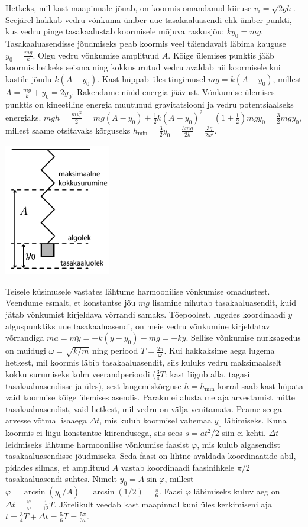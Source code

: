 {\ifSolution
\osa Hetkeks, mil kast maapinnale jõuab, on koormis omandanud kiiruse $v_i=\sqrt{2gh}$. Seejärel hakkab vedru võnkuma ümber uue tasakaaluasendi ehk ümber punkti, kus vedru pinge tasakaalustab koormisele mõjuva raskusjõu: $ky_0=mg$. Tasakaaluasendisse jõudmiseks peab koormis veel täiendavalt läbima kauguse $y_0=\frac{mg}{k}$. Olgu vedru võnkumise amplituud $A$. Kõige ülemises punktis jääb koormis hetkeks seisma ning kokkusurutud vedru avaldab nii koormisele kui kastile jõudu $k(A-y_0)$. Kast hüppab üles tingimusel $mg = k(A-y_0)$, millest $A = \frac{mg}{k}+y_0 =2y_0$. Rakendame nüüd energia jäävust. Võnkumise ülemises punktis on kineetiline energia muutunud gravitatsiooni ja vedru potentsiaalseks energiaks. $mgh=\frac{mv_i^2}{2} = mg(A-y_0) + \frac{1}{2}k(A-y_0)^2 = \left(1+ \frac{1}{2}\right)mgy_0 = \frac{3}{2}mgy_0$, millest saame otsitavaks kõrguseks $h_\text{min} = \frac{3}{2}y_0 = \frac{3mg}{2k} = \frac{3g}{2\omega^2}$.\\
\begin{center}
\includegraphics[width=0.35\textwidth]{2015-v3g-08-vedruJoonis_v2.pdf}
\end{center}
\osa Teisele küsimusele vastates lähtume harmoonilise võnkumise omadustest. Veendume esmalt, et konstantse jõu $mg$ lisamine nihutab tasakaaluasendit, kuid jätab võnkumist kirjeldava võrrandi samaks. Tõepoolest, lugedes koordinaadi $y$ alguspunktiks uue tasakaaluasendi, on meie vedru võnkumine kirjeldatav võrrandiga $ma = m \ddot{y} = -k(y-y_0) - mg = -ky$. Sellise võnkumise nurksagedus on muidugi $\omega=\sqrt{k/m}$ ning periood $T=\frac{2\pi}{\omega}$. Kui hakkaksime aega lugema hetkest, mil koormis läbib tasakaaluasendit, siis kuluks vedru maksimaalselt kokku surumiseks kolm veerandperioodi ($\frac{3}{4}T$: kast liigub alla, tagasi tasakaaluasendisse ja üles), sest langemiskõrguse $h=h_\text{min}$ korral saab kast hüpata vaid koormise kõige ülemises asendis. Paraku ei alusta me aja arvestamist mitte tasakaaluasendist, vaid hetkest, mil vedru on välja venitamata. Peame seega arvesse võtma lisaaega $\Delta t$, mis kulub koormisel vahemaa $y_0$ läbimiseks. Kuna koormis ei liigu konstantse kiirendusega, siis seos $s=at^2/2$ siin ei kehti. $\Delta t$ leidmiseks lähtume harmoonilise võnkumise faasist $\varphi$, mis kulub algasendist tasakaaluasendisse jõudmiseks. Seda faasi on lihtne avaldada koordinaatide abil, pidades silmas, et amplituud $A$ vastab koordinaadi faasinihkele $\pi/2$ tasakaaluasendi suhtes. Nimelt $y_0=A\sin\varphi$, millest $\varphi = \arcsin(y_0/A) = \arcsin(1/2) = \frac{\pi}{6}$. Faasi $\varphi$ läbimiseks kuluv aeg on $\Delta t = \frac{\varphi}{\omega}=\frac{1}{12}T$. Järelikult veedab kast maapinnal kuni üles kerkimiseni aja $t = \frac{3}{4}T + \Delta t = \frac{5}{6}T = \frac{5\pi}{3\omega}$.
}
